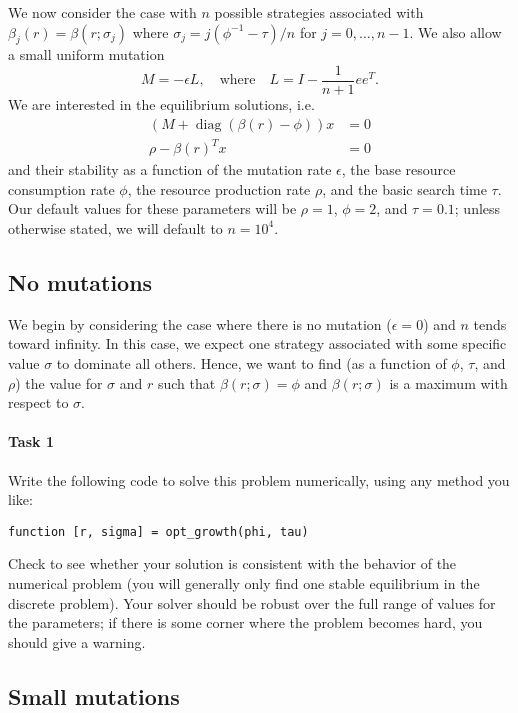 \documentclass[12pt, leqno]{article} %
\begin{document}
We now consider the case with $n$ possible strategies associated with
$\beta_j(r) = \beta(r; \sigma_j)$ where
$\sigma_{j} = j (\phi^{-1}-\tau)/n$ for $j = 0, \ldots, n-1$.
We also allow a small uniform mutation
\[
  M = -\epsilon L, \quad \mbox{where} \quad L = I - \frac{1}{n+1} ee^T.
\]
We are interested in the equilibrium solutions, i.e.
\begin{align*}
  \left(M + \operatorname{diag}(\beta(r)-\phi)\right)x &= 0\\
  \rho - \beta(r)^T x &= 0
\end{align*}
and their stability as a function of the mutation rate $\epsilon$, the
base resource consumption rate $\phi$, the resource production rate
$\rho$, and the basic search time $\tau$.  Our default values for
these parameters will be $\rho = 1$, $\phi = 2$, and $\tau = 0.1$;
unless otherwise stated, we will default to $n = 10^4$.

\subsection{No mutations}

We begin by considering the case where there is no mutation
($\epsilon = 0$) and $n$ tends toward infinity.  In this case,
we expect one strategy associated with some specific value $\sigma$
to dominate all others.  Hence, we want to find
(as a function of $\phi$, $\tau$, and $\rho$) the value
for $\sigma$ and $r$ such that $\beta(r; \sigma) = \phi$ and
$\beta(r; \sigma)$ is a maximum with respect to $\sigma$.

\paragraph{Task 1}
Write the following code to solve this problem numerically,
using any method you like:
\begin{lstlisting}[frame=single]
function [r, sigma] = opt_growth(phi, tau)
\end{lstlisting}
Check to see whether your solution is consistent with the behavior
of the numerical problem (you will generally only find one
stable equilibrium in the discrete problem).  Your solver should
be robust over the full range of values for the parameters;
if there is some corner where the problem becomes hard, you should
give a warning.

\subsection{Small mutations}
\end{document}
